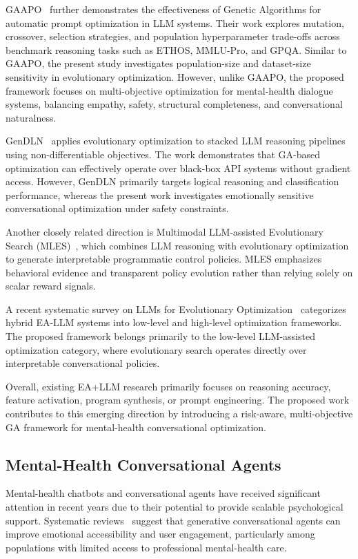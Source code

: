 \documentclass[mathematics,article,xetex,moreauthors]{Definitions/mdpi}
\begin{document}
GAAPO~\cite{gaapo2025} further demonstrates the effectiveness of Genetic
Algorithms for automatic prompt optimization in LLM systems. Their work explores
mutation, crossover, selection strategies, and population hyperparameter
trade-offs across benchmark reasoning tasks such as ETHOS, MMLU-Pro, and GPQA.
Similar to GAAPO, the present study investigates population-size and
dataset-size sensitivity in evolutionary optimization. However, unlike GAAPO,
the proposed framework focuses on multi-objective optimization for mental-health
dialogue systems, balancing empathy, safety, structural completeness, and
conversational naturalness.

GenDLN~\cite{gendl2025} applies evolutionary optimization to stacked LLM
reasoning pipelines using non-differentiable objectives. The work demonstrates
that GA-based optimization can effectively operate over black-box API systems
without gradient access. However, GenDLN primarily targets logical reasoning and
classification performance, whereas the present work investigates emotionally
sensitive conversational optimization under safety constraints.

Another closely related direction is Multimodal LLM-assisted Evolutionary
Search (MLES)~\cite{mles2026}, which combines LLM reasoning with evolutionary
optimization to generate interpretable programmatic control policies. MLES
emphasizes behavioral evidence and transparent policy evolution rather than
relying solely on scalar reward signals.

A recent systematic survey on LLMs for Evolutionary
Optimization~\cite{llm_ea_survey2025} categorizes hybrid EA-LLM systems into
low-level and high-level optimization frameworks. The proposed framework belongs
primarily to the low-level LLM-assisted optimization category, where
evolutionary search operates directly over interpretable conversational policies.

Overall, existing EA+LLM research primarily focuses on reasoning accuracy,
feature activation, program synthesis, or prompt engineering. The proposed work
contributes to this emerging direction by introducing a risk-aware,
multi-objective GA framework for mental-health conversational optimization.

\subsection{Mental-Health Conversational Agents}

Mental-health chatbots and conversational agents have received significant
attention in recent years due to their potential to provide scalable
psychological support. Systematic
reviews~\cite{jmir2025_chatbots,pmc2026_chatbots} suggest that generative
conversational agents can improve emotional accessibility and user engagement,
particularly among populations with limited access to professional mental-health
care.
\end{document}
